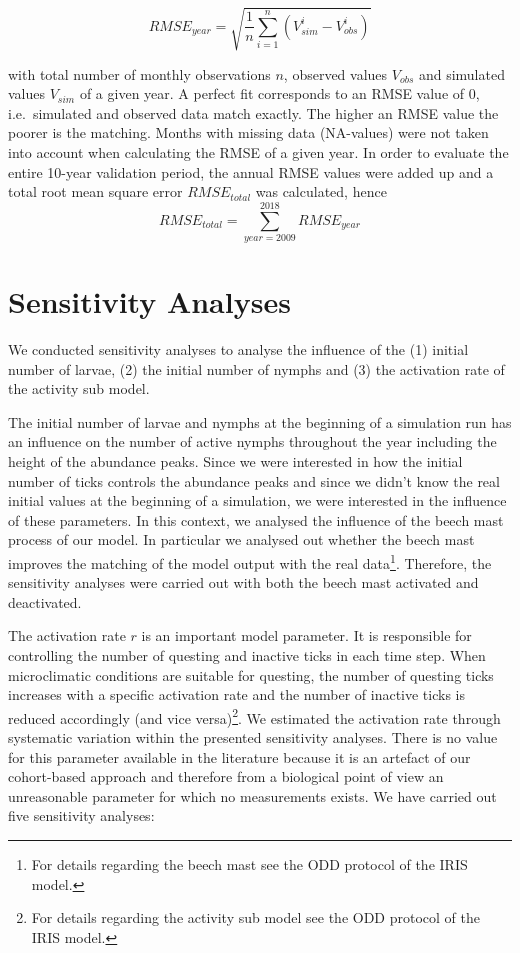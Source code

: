 \documentclass[a4paper, 11pt]{scrartcl}
\begin{document}
\begin{equation}\label{eq:rmse}
RMSE_{year} = \sqrt{ \frac{1}{n} \sum_{i=1}^n (V_{sim}^i - V_{obs}^i)}
\end{equation}

with total number of monthly observations $n$, observed values $V_{obs}$ and simulated values $V_{sim}$ of a given year. A perfect fit corresponds to an RMSE value of 0, i.e.\ simulated and observed data match exactly. The higher an RMSE value the poorer is the matching. Months with missing data (NA-values) were not taken into account when calculating the RMSE of a given year. In order to evaluate the entire 10-year validation period, the annual RMSE values were added up and a total root mean square error $RMSE_{total}$ was calculated, hence
\begin{equation}\label{eq:total_rmse}
RMSE_{total} = \sum_{year=2009}^{2018} RMSE_{year}
\end{equation}


\section{Sensitivity Analyses}
We conducted sensitivity analyses to analyse the influence of the (1) initial number of larvae, (2) the initial number of nymphs and (3) the activation rate of the activity sub model.

The initial number of larvae and nymphs at the beginning of a simulation run has an influence on the number of active nymphs throughout the year including the height of the abundance peaks. Since we were interested in how the initial number of ticks controls the abundance peaks and since we didn't know the real initial values at the beginning of a simulation, we were interested in the influence of these parameters. In this context, we analysed the influence of the beech mast process of our model. In particular we analysed out whether the beech mast improves the matching of the model output with the real data\footnote{For details regarding the beech mast see the ODD protocol of the IRIS model.}. Therefore, the sensitivity analyses were carried out with both the beech mast activated and deactivated.

The activation rate $r$ is an important model parameter. It is responsible for controlling the number of questing and inactive ticks in each time step. When microclimatic conditions are suitable for questing, the number of questing ticks increases with a specific activation rate and the number of inactive ticks is reduced accordingly (and vice versa)\footnote{For details regarding the activity sub model see the ODD protocol of the IRIS model.}. We estimated the activation rate through systematic variation within the presented sensitivity analyses. There is no value for this parameter available in the literature because it is an artefact of our cohort-based approach and therefore from a biological point of view an unreasonable parameter for which no measurements exists. We have carried out five sensitivity analyses:
\end{document}
